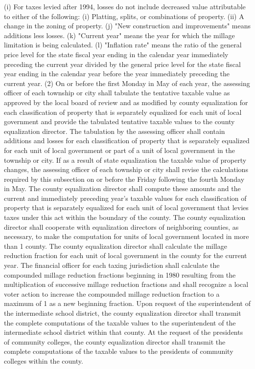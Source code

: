 \documentclass[12pt,\documentclassflag]{michiganCourtOfAppealsBrief}
\begin{document}
  (i) For taxes levied after 1994, losses do not include decreased value attributable to either of the following:
  (i) Platting, splits, or combinations of property.
  (ii) A change in the zoning of property.
  (j) "New construction and improvements" means additions less losses.
  (k) "Current year" means the year for which the millage limitation is being calculated.
  (l) "Inflation rate" means the ratio of the general price level for the state fiscal year ending in the calendar year immediately preceding the current year divided by the general price level for the state fiscal year ending in the calendar year before the year immediately preceding the current year.
  (2) On or before the first Monday in May of each year, the assessing officer of each township or city shall tabulate the tentative taxable value as approved by the local board of review and as modified by county equalization for each classification of property that is separately equalized for each unit of local government and provide the tabulated tentative taxable values to the county equalization director. The tabulation by the assessing officer shall contain additions and losses for each classification of property that is separately equalized for each unit of local government or part of a unit of local government in the township or city. If as a result of state equalization the taxable value of property changes, the assessing officer of each township or city shall revise the calculations required by this subsection on or before the Friday following the fourth Monday in May. The county equalization director shall compute these amounts and the current and immediately preceding year's taxable values for each classification of property that is separately equalized for each unit of local government that levies taxes under this act within the boundary of the county. The county equalization director shall cooperate with equalization directors of neighboring counties, as necessary, to make the computation for units of local government located in more than 1 county. The county equalization director shall calculate the millage reduction fraction for each unit of local government in the county for the current year. The financial officer for each taxing jurisdiction shall calculate the compounded millage reduction fractions beginning in 1980 resulting from the multiplication of successive millage reduction fractions and shall recognize a local voter action to increase the compounded millage reduction fraction to a maximum of 1 as a new beginning fraction. Upon request of the superintendent of the intermediate school district, the county equalization director shall transmit the complete computations of the taxable values to the superintendent of the intermediate school district within that county. At the request of the presidents of community colleges, the county equalization director shall transmit the complete computations of the taxable values to the presidents of community colleges within the county.
\end{document}
